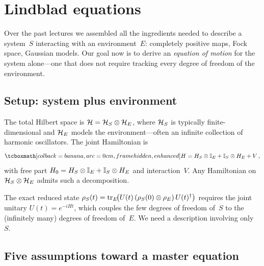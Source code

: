 
\section{Lindblad equations}\label{sec:lindblad}

Over the past lectures we assembled all the ingredients needed to
describe a system~$S$ interacting with an environment~$E$: completely
positive maps, Fock space, Gaussian models.  Our goal now is to derive
an \emph{equation of motion} for the system alone---one that does not
require tracking every degree of freedom of the environment.

\subsection{Setup: system plus environment}%
\label{sec:sys-env-setup}

The total Hilbert space is
$\mathcal{H} = \mathcal{H}_S \otimes \mathcal{H}_E$,
where $\mathcal{H}_S$ is typically finite-dimensional and $\mathcal{H}_E$ models
the environment---often an infinite collection of harmonic oscillators.
The joint Hamiltonian is
\begin{equation}\label{eq:H-total}
  \eqbox{H = H_S \tp \One_E + \One_S \tp H_E + V}\,,
\end{equation}
with free part $H_0 = H_S \otimes \mathbb{I}_E + \mathbb{I}_S \otimes H_E$ and
interaction~$V$.  Any Hamiltonian on $\mathcal{H}_S \otimes \mathcal{H}_E$ admits
such a decomposition.

\begin{intuition}
  The exact reduced state
  $\rho_S(t) = \operatorname{tr}_E\!\bigl(U(t)\,(\rho_S(0)\otimes\rho_E)\,U(t)^\dagger\bigr)$
  requires the joint unitary $U(t)=e^{-iHt}$, which couples the few
  degrees of freedom of~$S$ to the (infinitely many) degrees of
  freedom of~$E$.  We need a description involving only~$S$.
\end{intuition}

\subsection{Five assumptions toward a master equation}%
\label{sec:assumptions}

